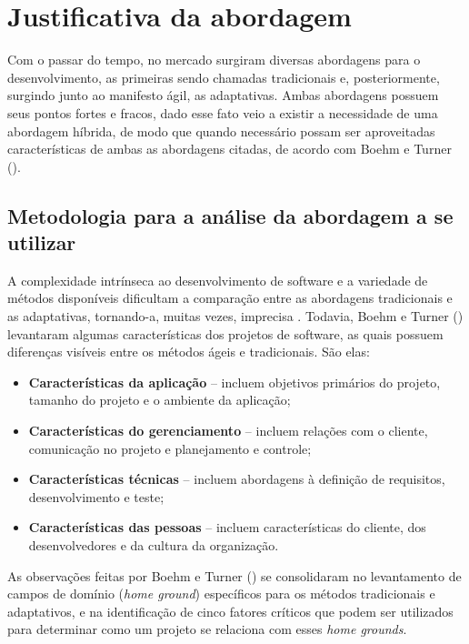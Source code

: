 \chapter[Justificativa da abordagem]{Justificativa da abordagem}
  
    Com o passar do tempo, no mercado surgiram diversas abordagens para o desenvolvimento,
   as primeiras sendo chamadas tradicionais e, posteriormente, surgindo junto ao manifesto ágil,
   as adaptativas. Ambas abordagens possuem seus pontos fortes e fracos, dado esse fato veio a existir a necessidade
   de uma abordagem híbrida, de modo que quando necessário possam ser aproveitadas características de ambas as abordagens
   citadas, de acordo com Boehm e Turner (\citeyear{boehm}).
  
  \section{Metodologia para a análise da abordagem a se utilizar}
   
   A complexidade intrínseca ao desenvolvimento de software e a variedade de métodos disponíveis dificultam
   a comparação entre as abordagens tradicionais e as adaptativas, tornando-a, muitas vezes, imprecisa \cite{boehm}.
   Todavia, Boehm e Turner (\citeyear{boehm}) levantaram algumas características dos projetos de software, as quais possuem diferenças
   visíveis entre os métodos ágeis e tradicionais. São elas:
  
   \begin{itemize}
    \item \textbf{Características da aplicação} – incluem objetivos primários do projeto, tamanho do projeto e o ambiente da aplicação;
    \item \textbf{Características do gerenciamento} – incluem relações com o cliente, comunicação no projeto e planejamento e controle;
    \item \textbf{Características técnicas} – incluem abordagens à definição de requisitos, desenvolvimento e teste;
    \item \textbf{Características das pessoas} – incluem características do cliente, dos desenvolvedores e da cultura da organização.
   \end{itemize}   
   
   As observações feitas por Boehm e Turner (\citeyear{boehm}) se consolidaram no levantamento de campos de domínio (\textit{home ground}) específicos
   para os métodos tradicionais e adaptativos, e na identificação de cinco fatores críticos que podem ser utilizados para 
   determinar como um projeto se relaciona com esses \textit{home grounds}.
   
